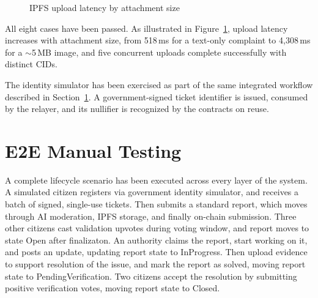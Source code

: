 \begin{figure}[!htb]
    \centering
    \caption{IPFS upload latency by attachment size}
    \label{fig:ipfs-latency-chart}
\end{figure}



All eight cases have been passed. As illustrated in Figure~\ref{fig:ipfs-latency-chart}, upload latency increases with attachment size, from 518\,ms for a text-only complaint to 4{,}308\,ms for a $\sim$5\,MB image, and five concurrent uploads complete successfully with distinct CIDs.

The identity simulator has been exercised as part of the same integrated workflow described in Section~\ref{sec:e2e-testing}. A government-signed ticket identifier is issued, consumed by the relayer, and its nullifier is recognized by the contracts on reuse.

\section{\ac{E2E} Manual Testing }
\label{sec:e2e-testing}

A complete lifecycle scenario has been executed across every layer of the system. A simulated citizen registers via government identity simulator, and receives a batch of signed, single-use tickets. Then submits a standard report, which moves through AI moderation, IPFS storage, and finally on-chain submission. Three other citizens cast validation upvotes during voting window, and report moves to state Open after finalizaton. An authority claims the report, start working on it, and posts an update, updating report state to InProgress. Then upload evidence to support resolution of the issue, and mark the report as solved, moving report state to PendingVerification. Two citizens accept the resolution by submitting positive verification votes, moving report state to Closed. 

